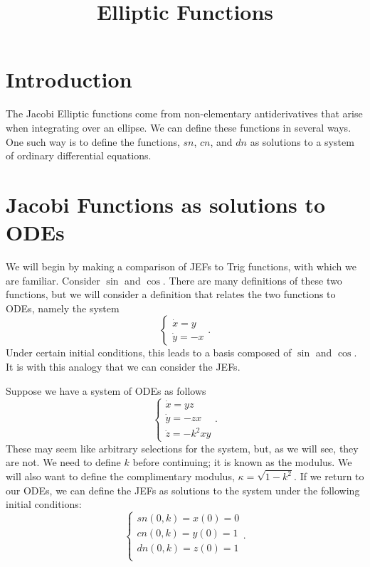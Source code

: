 \documentclass[notitlepage]{hw}
\title{Elliptic Functions}
\date{}
\author{}
\begin{document}
\maketitle

\section{Introduction}

The Jacobi Elliptic functions come from non-elementary antiderivatives that arise when integrating
over an ellipse. We can define these functions in several ways. One such way is to define the
functions, $sn$, $cn$, and $dn$ as solutions to a system of ordinary differential equations.

\section{Jacobi Functions as solutions to ODEs}

We will begin by making a comparison of JEFs to Trig functions, with which we are familiar. Consider
$\sin{}$ and $\cos{}$. There are many definitions of these two functions, but we will consider a
definition that relates the two functions to ODEs, namely the system
\[
\begin{cases}
\dot{x}=y\\
\dot{y}=-x
\end{cases}.
\]
Under certain initial conditions, this leads to a basis composed of $\sin{}$ and $\cos{}$. It is with
this analogy that we can consider the JEFs.

Suppose we have a system of ODEs as follows
\[
\begin{cases}
\dot{x}=yz\\
\dot{y}=-zx\\
\dot{z}=-k^{2}xy
\end{cases}.
\]
These may seem like arbitrary selections for the system, but, as we will see, they are not. We need
to define $k$ before continuing; it is known as the modulus. We will also want to define the
complimentary modulus, $\kappa=\sqrt{1-k^{2}}$. If we return to our ODEs, we can define the JEFs
as solutions to the system under the following initial conditions:
\[
\begin{cases}
sn(0,k)=x(0)=0\\
cn(0,k)=y(0)=1\\
dn(0,k)=z(0)=1\\
\end{cases}.
\]
\end{document}
